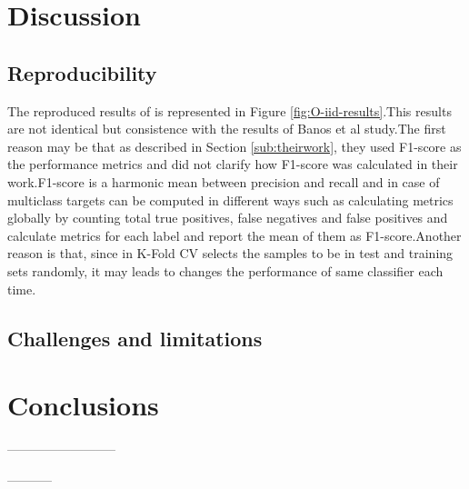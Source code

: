 \section{Discussion}
  
\subsection{Reproducibility}
The reproduced results of \cite{banos2014window} is represented in Figure \ref{fig:O-iid-results}.This results are not identical but consistence with the results of Banos et al study.The first reason may be that as described in Section \ref{sub:theirwork}, they used F1-score as the performance metrics and did not clarify how F1-score was calculated in their work.F1-score is a harmonic mean between precision and recall and in case of multiclass targets can be computed in different ways such as calculating metrics globally by counting total true positives, false negatives and false positives and calculate metrics for each label and report the mean of them as F1-score.Another reason is that, since in K-Fold CV selects the samples to be in test and training sets randomly, it may leads to changes the performance of same classifier each time.


\subsection{Challenges and limitations}


\section{Conclusions}
--------------------------




\begin{acks}

-----------
\end{acks}
